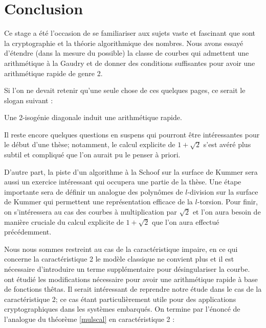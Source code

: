 \documentclass[a4paper,12pt]{article}
\newtheorem{theoreme}{Theorème}[section]
\theoremstyle{definition}
\theoremstyle{remark}
\numberwithin{equation}{section}
\begin{document}
\section{Conclusion}
Ce stage %
a été l'occasion de se familiariser aux sujets vaste et fascinant que sont la cryptographie et la théorie algorithmique des nombres. Nous avons essayé d'étendre (dans la mesure du possible) la classe de courbes qui admettent une arithmétique à la Gaudry et de donner des conditions suffisantes pour avoir une arithmétique rapide de genre 2.

Si l'on ne devait retenir qu'une seule chose de ces quelques pages, ce serait le slogan suivant :
\begin{center}
\huge{Une 2-isogénie diagonale induit une arithmétique rapide.}
\end{center}

Il reste encore quelques questions en suspens qui pourront être intéressantes pour le début d'une thèse; notamment, le calcul explicite de $1+\sqrt{2}$ s'est avéré plus subtil et compliqué que l'on aurait pu le penser à priori.

D'autre part, la piste d'un algorithme à la Schoof sur la surface de Kummer sera aussi un exercice intéressant qui occupera une partie de la thèse. Une étape importante sera de définir un analogue des polynômes de $l$-division sur la surface de Kummer qui permettent une représentation efficace de la $l$-torsion. Pour finir, on s'intéressera au cas des courbes à multiplication par $\sqrt{2}$ et l'on aura besoin de manière cruciale du calcul explicite de $1+\sqrt{2}$ que l'on aura effectué précédemment.

Nous nous sommes restreint au cas de la caractéristique impaire, en ce qui concerne la caractéristique 2 le modèle classique ne convient plus et il est nécessaire d'introduire un terme supplémentaire pour désingulariser la courbe. \citet{lubicz} ont étudié les modifications nécessaire pour avoir une arithmétique rapide à base de fonctions thêtas. Il serait intéressant de reprendre notre étude dans le cas de la caractéristique 2; ce cas étant particulièrement utile pour des applications cryptographiques dans les systèmes embarqués. On termine par l'énoncé de l'analogue du théorème \ref{mulscal} en caractéristique 2 :

\end{document}
